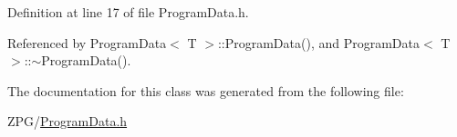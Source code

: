 Definition at line 17 of file Program\+Data.\+h.



Referenced by Program\+Data$<$ T $>$\+::\+Program\+Data(), and Program\+Data$<$ T $>$\+::$\sim$\+Program\+Data().



The documentation for this class was generated from the following file\+:\begin{DoxyCompactItemize}
\item 
Z\+P\+G/\mbox{\hyperlink{ProgramData_8h}{Program\+Data.\+h}}\end{DoxyCompactItemize}
